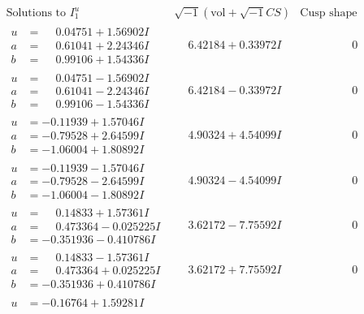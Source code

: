 \documentclass[1p]{elsarticle_modified}
\theoremstyle{definition}
\newcommand{\I}{\sqrt{-1}}
\begin{document}
$$\begin{array}{c|c|c}
\text{Solutions to }I^u_{1}& \I (\text{vol} + \sqrt{-1}CS) & \text{Cusp shape}\\
 \hline 
\begin{aligned}
u &= \phantom{-}0.04751 + 1.56902 I \\
a &= \phantom{-}0.61041 + 2.24346 I \\
b &= \phantom{-}0.99106 + 1.54336 I\end{aligned}
 & \phantom{-}6.42184 + 0.33972 I & \phantom{-0.000000 } 0 \\ \hline\begin{aligned}
u &= \phantom{-}0.04751 - 1.56902 I \\
a &= \phantom{-}0.61041 - 2.24346 I \\
b &= \phantom{-}0.99106 - 1.54336 I\end{aligned}
 & \phantom{-}6.42184 - 0.33972 I & \phantom{-0.000000 } 0 \\ \hline\begin{aligned}
u &= -0.11939 + 1.57046 I \\
a &= -0.79528 + 2.64599 I \\
b &= -1.06004 + 1.80892 I\end{aligned}
 & \phantom{-}4.90324 + 4.54099 I & \phantom{-0.000000 } 0 \\ \hline\begin{aligned}
u &= -0.11939 - 1.57046 I \\
a &= -0.79528 - 2.64599 I \\
b &= -1.06004 - 1.80892 I\end{aligned}
 & \phantom{-}4.90324 - 4.54099 I & \phantom{-0.000000 } 0 \\ \hline\begin{aligned}
u &= \phantom{-}0.14833 + 1.57361 I \\
a &= \phantom{-}0.473364 - 0.025225 I \\
b &= -0.351936 - 0.410786 I\end{aligned}
 & \phantom{-}3.62172 - 7.75592 I & \phantom{-0.000000 } 0 \\ \hline\begin{aligned}
u &= \phantom{-}0.14833 - 1.57361 I \\
a &= \phantom{-}0.473364 + 0.025225 I \\
b &= -0.351936 + 0.410786 I\end{aligned}
 & \phantom{-}3.62172 + 7.75592 I & \phantom{-0.000000 } 0 \\ \hline\begin{aligned}
u &= -0.16764 + 1.59281 I \\

\end{aligned}
\end{array}$$
\end{document}
